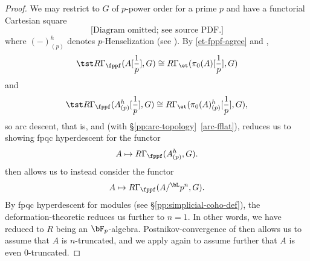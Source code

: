 \begin{proof}
We may restrict to $G$ of $p$-power order for a prime $p$ and have a functorial Cartesian square
\[\text{[Diagram omitted; see source PDF.]}\]
where $(-)_{(p)}^h$ denotes $p$-Henselization (see ). By \eqref{et-fppf-agree} and ,
\[
\tst R\Gamma_\fppf(A[\frac 1p], G) \cong R\Gamma_\et(\pi_0(A)[\frac 1p], G)
\]
and
\[
\tst R\Gamma_\fppf(A_{(p)}^h[\frac 1p],G) \cong R\Gamma_\et(\pi_0(A)_{(p)}^h[\frac 1p], G),
\]
so arc descent, that is,  and  (with \S\ref{pp:arc-topology}~\ref{arc-fflat}), reduces us to showing fpqc hyperdescent for the functor
\[
A\mapsto R\Gamma_\fppf(A_{(p)}^h,G).
\]
 then allows us to instead consider the functor
\[
A\mapsto R\Gamma_\fppf(A/^\bL p^n,G).
\]
By fpqc hyperdescent for modules (see \S\ref{pp:simplicial-coho-def}), the deformation-theoretic  reduces us further to $n = 1$. In other words, we have reduced to $R$ being an $\bF_p$-algebra. Postnikov-convergence of  then allows us to assume that $A$ is $n$-truncated, and we apply  again  to assume further that $A$ is even $0$-truncated.


\end{proof}

